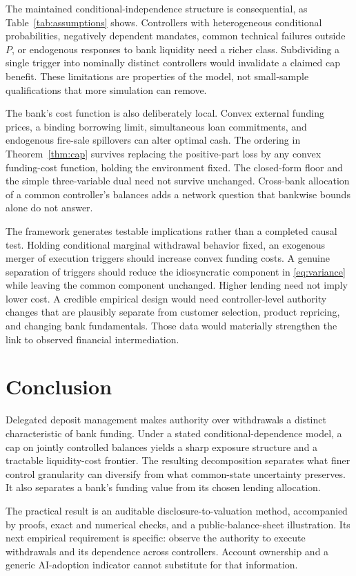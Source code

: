 \documentclass[11pt]{article}
\theoremstyle{definition}\newtheorem{definition}[theorem]{Definition}
\begin{document}
The maintained conditional-independence structure is consequential, as Table~\ref{tab:assumptions} shows. Controllers with heterogeneous conditional probabilities, negatively dependent mandates, common technical failures outside \(P\), or endogenous responses to bank liquidity need a richer class. Subdividing a single trigger into nominally distinct controllers would invalidate a claimed cap benefit. These limitations are properties of the model, not small-sample qualifications that more simulation can remove.

The bank's cost function is also deliberately local. Convex external funding prices, a binding borrowing limit, simultaneous loan commitments, and endogenous fire-sale spillovers can alter optimal cash. The ordering in Theorem~\ref{thm:cap} survives replacing the positive-part loss by any convex funding-cost function, holding the environment fixed. The closed-form floor and the simple three-variable dual need not survive unchanged. Cross-bank allocation of a common controller's balances adds a network question that bankwise bounds alone do not answer.

The framework generates testable implications rather than a completed causal test. Holding conditional marginal withdrawal behavior fixed, an exogenous merger of execution triggers should increase convex funding costs. A genuine separation of triggers should reduce the idiosyncratic component in \eqref{eq:variance} while leaving the common component unchanged. Higher lending need not imply lower cost. A credible empirical design would need controller-level authority changes that are plausibly separate from customer selection, product repricing, and changing bank fundamentals. Those data would materially strengthen the link to observed financial intermediation.

\section{Conclusion}
Delegated deposit management makes authority over withdrawals a distinct characteristic of bank funding. Under a stated conditional-dependence model, a cap on jointly controlled balances yields a sharp exposure structure and a tractable liquidity-cost frontier. The resulting decomposition separates what finer control granularity can diversify from what common-state uncertainty preserves. It also separates a bank's funding value from its chosen lending allocation.

The practical result is an auditable disclosure-to-valuation method, accompanied by proofs, exact and numerical checks, and a public-balance-sheet illustration. Its next empirical requirement is specific: observe the authority to execute withdrawals and its dependence across controllers. Account ownership and a generic AI-adoption indicator cannot substitute for that information.
\end{document}
